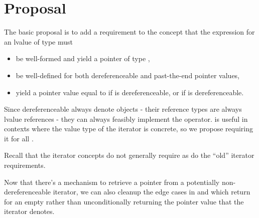 \chapter{Proposal}

The basic proposal is to add a requirement to the
 concept that the expression
 for an lvalue  of type  must
\begin{itemize}
\item be well-formed and yield a pointer of type
  ,
\item be well-defined for both dereferenceable and past-the-end pointer values,
\item yield a pointer value equal to  if  is
  dereferenceable, or  if  is
  dereferenceable.
\end{itemize}

Since dereferenceable  always denote objects -
their reference types are always lvalue references - they can always feasibly
implement the \tcode{->} operator. \tcode{->} is useful in contexts where the
value type of the iterator is concrete, so we propose requiring it for all
.
\begin{note}
Recall that the iterator concepts do not generally require  as
do the ``old'' iterator requirements.
\end{note}

Now that there's a mechanism to retrieve a pointer from a potentially
non-dereferenceable iterator, we can also cleanup the edge cases in
 and  which return
 for an empty  rather than unconditionally
returning the pointer value that the  iterator denotes.

